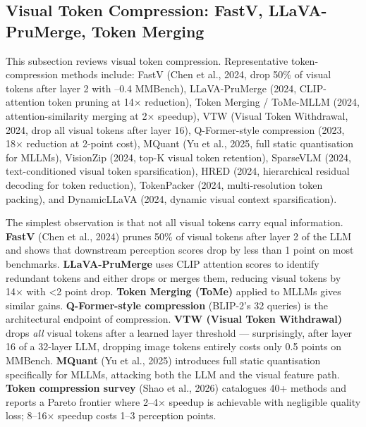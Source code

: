 \subsection{Visual Token Compression: FastV, LLaVA-PruMerge, Token Merging}\label{visual-token-compression-fastv-llava-prumerge-token-merging}

This subsection reviews visual token compression. Representative token-compression methods include: FastV (Chen et al., 2024, drop 50\% of visual tokens after layer 2 with --0.4 MMBench), LLaVA-PruMerge (2024, CLIP-attention token pruning at 14× reduction), Token Merging / ToMe-MLLM (2024, attention-similarity merging at 2× speedup), VTW (Visual Token Withdrawal, 2024, drop all visual tokens after layer 16), Q-Former-style compression (2023, 18× reduction at 2-point cost), MQuant (Yu et al., 2025, full static quantisation for MLLMs), VisionZip (2024, top-K visual token retention), SparseVLM (2024, text-conditioned visual token sparsification), HRED (2024, hierarchical residual decoding for token reduction), TokenPacker (2024, multi-resolution token packing), and DynamicLLaVA (2024, dynamic visual context sparsification).

The simplest observation is that not all visual tokens carry equal information. \textbf{FastV} (Chen et al., 2024) prunes 50\% of visual tokens after layer 2 of the LLM and shows that downstream perception scores drop by less than 1 point on most benchmarks. \textbf{LLaVA-PruMerge} uses CLIP attention scores to identify redundant tokens and either drops or merges them, reducing visual tokens by 14× with \textless2 point drop. \textbf{Token Merging (ToMe)} applied to MLLMs gives similar gains. \textbf{Q-Former-style compression} (BLIP-2's 32 queries) is the architectural endpoint of compression. \textbf{VTW (Visual Token Withdrawal)} drops \emph{all} visual tokens after a learned layer threshold --- surprisingly, after layer 16 of a 32-layer LLM, dropping image tokens entirely costs only 0.5 points on MMBench. \textbf{MQuant} (Yu et al., 2025) introduces full static quantisation specifically for MLLMs, attacking both the LLM and the visual feature path. \textbf{Token compression survey} (Shao et al., 2026) catalogues 40+ methods and reports a Pareto frontier where 2--4× speedup is achievable with negligible quality loss; 8--16× speedup costs 1--3 perception points.

